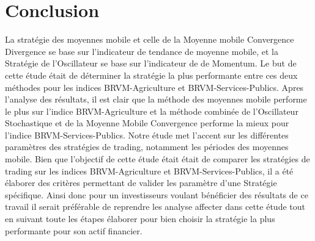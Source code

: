 \chapter*{Conclusion}

\par{La stratégie des moyennes mobile et celle de la Moyenne mobile Convergence Divergence
se base sur l'indicateur de tendance de moyenne mobile, et la Stratégie de l'Oscillateur 
se base sur l'indicateur de 
de Momentum. Le but de cette étude était de déterminer la stratégie la plus performante 
entre ces deux méthodes pour les indices BRVM-Agriculture et BRVM-Services-Publics.
Apres l'analyse des résultats, il est clair que la méthode des moyennes mobile 
performe le  plus sur l'indice BRVM-Agriculture et la méthode combinée de l'Oscillateur Stochastique et 
de la Moyenne Mobile Convergence performe la mieux pour l'indice BRVM-Services-Publics. 
Notre étude met l'accent sur les différentes paramètres des stratégies de trading, 
notamment les périodes des moyennes mobile. Bien que l'objectif de cette étude était 
était de comparer les stratégies de trading sur les indices BRVM-Agriculture et 
BRVM-Services-Publics, il a été élaborer des critères permettant de valider les paramètre
d'une Stratégie spécifique. Ainsi donc pour un investisseurs voulant bénéficier des résultats de 
ce travail il serait préférable de reprendre les analyse affecter dans cette étude tout en 
suivant toute les étapes élaborer pour bien choisir la stratégie la plus performante pour 
son actif financier.
}


